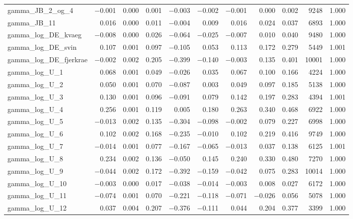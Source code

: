 \documentclass[12pt]{article}
\begin{document}
\begin{longtable}{lrrrrrrrrrr}
gamma\_JB\_2\_og\_4  & $-$0.001 & 0.000 & 0.001 & $-$0.003 & $-$0.002 & $-$0.001 &  0.000 &  0.002 &  9248 & 1.000 \\
gamma\_JB\_11        &  0.016 & 0.000 & 0.011 & $-$0.004 &  0.009 &  0.016 &  0.024 &  0.037 &  6893 & 1.000 \\
gamma\_log\_DE\_kvaeg    & $-$0.008 & 0.000 & 0.026 & $-$0.064 & $-$0.025 & $-$0.007 &  0.010 &  0.040 &  9480 & 1.000 \\
gamma\_log\_DE\_svin     &  0.107 & 0.001 & 0.097 & $-$0.105 &  0.053 &  0.113 &  0.172 &  0.279 &  5449 & 1.001 \\
gamma\_log\_DE\_fjerkrae & $-$0.002 & 0.002 & 0.205 & $-$0.399 & $-$0.140 & $-$0.003 &  0.135 &  0.401 & 10001 & 1.000 \\
gamma\_log\_U\_1  &  0.068 & 0.001 & 0.049 & $-$0.026 &  0.035 &  0.067 &  0.100 &  0.166 &  4224 & 1.000 \\
gamma\_log\_U\_2  &  0.050 & 0.001 & 0.070 & $-$0.087 &  0.003 &  0.049 &  0.097 &  0.185 &  5138 & 1.000 \\
gamma\_log\_U\_3  &  0.130 & 0.001 & 0.096 & $-$0.091 &  0.079 &  0.142 &  0.197 &  0.283 &  4394 & 1.001 \\
gamma\_log\_U\_4  &  0.256 & 0.001 & 0.119 &  0.005 &  0.180 &  0.263 &  0.340 &  0.468 &  6922 & 1.000 \\
gamma\_log\_U\_5  & $-$0.013 & 0.002 & 0.135 & $-$0.304 & $-$0.098 & $-$0.002 &  0.079 &  0.227 &  6998 & 1.000 \\
gamma\_log\_U\_6  &  0.102 & 0.002 & 0.168 & $-$0.235 & $-$0.010 &  0.102 &  0.219 &  0.416 &  9749 & 1.000 \\
gamma\_log\_U\_7  & $-$0.014 & 0.001 & 0.077 & $-$0.167 & $-$0.065 & $-$0.013 &  0.037 &  0.138 &  6125 & 1.001 \\
gamma\_log\_U\_8  &  0.234 & 0.002 & 0.136 & $-$0.050 &  0.145 &  0.240 &  0.330 &  0.480 &  7270 & 1.000 \\
gamma\_log\_U\_9  & $-$0.044 & 0.002 & 0.172 & $-$0.392 & $-$0.159 & $-$0.042 &  0.075 &  0.283 & 10014 & 1.000 \\
gamma\_log\_U\_10 & $-$0.003 & 0.000 & 0.017 & $-$0.038 & $-$0.014 & $-$0.003 &  0.008 &  0.027 &  6172 & 1.000 \\
gamma\_log\_U\_11 & $-$0.074 & 0.001 & 0.070 & $-$0.221 & $-$0.118 & $-$0.071 & $-$0.026 &  0.056 &  5078 & 1.000 \\
gamma\_log\_U\_12 &  0.037 & 0.004 & 0.207 & $-$0.376 & $-$0.111 &  0.044 &  0.204 &  0.377 &  3399 & 1.000 \\

\end{longtable}
\end{document}
